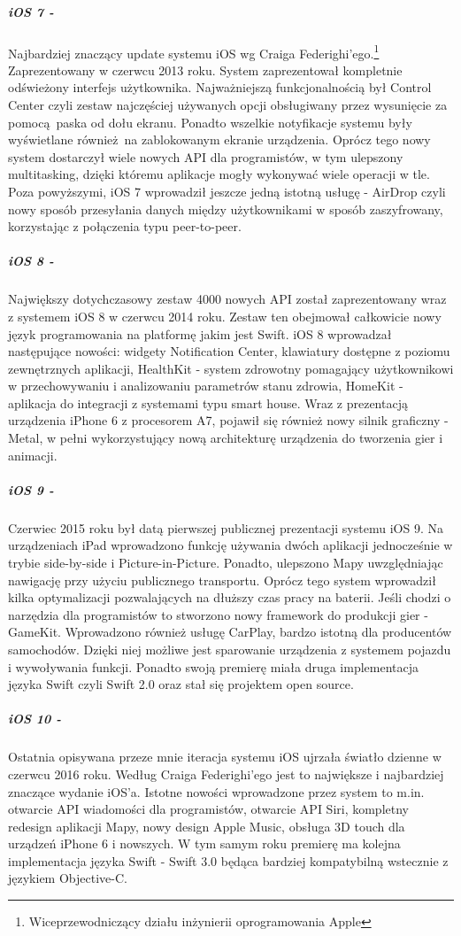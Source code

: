 \documentclass[12pt,oneside,a4paper]{report}
\begin{document}
\subparagraph{iOS 7 -}Najbardziej znaczący update systemu iOS wg Craiga Federighi'ego.\footnote{Wiceprzewodniczący działu inżynierii oprogramowania Apple} Zaprezentowany w czerwcu 2013 roku. System zaprezentował kompletnie odświeżony interfejs użytkownika. Najważniejszą funkcjonalnością był Control Center czyli zestaw najczęściej używanych opcji obsługiwany przez wysunięcie za pomocą paska od dołu ekranu. Ponadto wszelkie notyfikacje systemu były wyświetlane również na zablokowanym ekranie urządzenia. Oprócz tego nowy system dostarczył wiele nowych API dla programistów, w tym ulepszony multitasking, dzięki któremu aplikacje mogły wykonywać wiele operacji w tle. Poza powyższymi, iOS 7 wprowadził jeszcze jedną istotną usługę - AirDrop czyli nowy sposób przesyłania danych między użytkownikami w sposób zaszyfrowany, korzystając z połączenia typu peer-to-peer.\cite{ios7}
\subparagraph{iOS 8 -}Największy dotychczasowy zestaw 4000 nowych API został zaprezentowany wraz z systemem iOS 8 w czerwcu 2014 roku. Zestaw ten obejmował całkowicie nowy język programowania na platformę jakim jest Swift. iOS 8 wprowadzał następujące nowości: widgety Notification Center, klawiatury dostępne z poziomu zewnętrznych aplikacji, HealthKit - system zdrowotny pomagający użytkownikowi w przechowywaniu i analizowaniu parametrów stanu zdrowia, HomeKit - aplikacja do integracji z systemami typu smart house. Wraz z prezentacją urządzenia iPhone 6 z procesorem A7, pojawił się również nowy silnik graficzny - Metal, w pełni wykorzystujący nową architekturę urządzenia do tworzenia gier i animacji.\cite{ios8}
\subparagraph{iOS 9 -}Czerwiec 2015 roku był datą pierwszej publicznej prezentacji systemu iOS 9. Na urządzeniach iPad wprowadzono funkcję używania dwóch aplikacji jednocześnie w trybie side-by-side i Picture-in-Picture. Ponadto, ulepszono Mapy uwzględniając nawigację przy użyciu publicznego transportu. Oprócz tego system wprowadził kilka optymalizacji pozwalających na dłuższy czas pracy na baterii. Jeśli chodzi o narzędzia dla programistów to stworzono nowy framework do produkcji gier - GameKit. Wprowadzono również usługę CarPlay, bardzo istotną dla producentów samochodów. Dzięki niej możliwe jest sparowanie urządzenia z systemem pojazdu i wywoływania funkcji. Ponadto swoją premierę miała druga implementacja języka Swift czyli Swift 2.0 oraz stał się projektem open source.\cite{ios9}
\subparagraph{iOS 10 -}Ostatnia opisywana przeze mnie iteracja systemu iOS ujrzała światło dzienne w czerwcu 2016 roku. Według Craiga Federighi'ego jest to największe i najbardziej znaczące wydanie iOS'a. Istotne nowości wprowadzone przez system to m.in. otwarcie API wiadomości dla programistów, otwarcie API Siri, kompletny redesign aplikacji Mapy, nowy design Apple Music, obsługa 3D touch dla urządzeń iPhone 6 i nowszych. W tym samym roku premierę ma kolejna implementacja języka Swift - Swift 3.0 będąca bardziej kompatybilną wstecznie z językiem Objective-C.\cite{compatibility}\cite{ios10}
\end{document}
